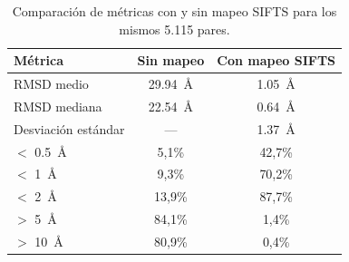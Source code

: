 \begin{table}[H]
\centering
\caption{Comparaci\'on de m\'etricas con y sin mapeo SIFTS para los mismos 5.115 pares.}
\label{tab:sifts_comparison}
\begin{tabular}{@{}lcc@{}}
\toprule
\textbf{M\'etrica} & \textbf{Sin mapeo} & \textbf{Con mapeo SIFTS} \\
\midrule
RMSD medio & \SI{29,94}{\angstrom} & \SI{1,05}{\angstrom} \\
RMSD mediana & \SI{22,54}{\angstrom} & \SI{0,64}{\angstrom} \\
Desviaci\'on est\'andar & --- & \SI{1,37}{\angstrom} \\
$<$ \SI{0,5}{\angstrom} & 5,1\% & 42,7\% \\
$<$ \SI{1}{\angstrom} & 9,3\% & 70,2\% \\
$<$ \SI{2}{\angstrom} & 13,9\% & 87,7\% \\
$>$ \SI{5}{\angstrom} & 84,1\% & 1,4\% \\
$>$ \SI{10}{\angstrom} & 80,9\% & 0,4\% \\
\bottomrule
\end{tabular}
\end{table}
